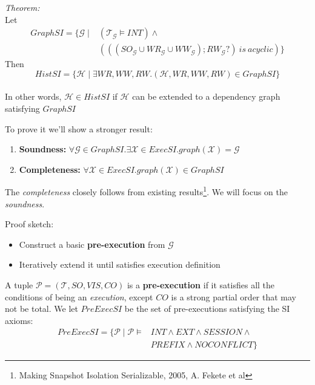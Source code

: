 \documentclass{beamer}
\begin{document}
\begin{frame}
	\textit{Theorem:} \\
	Let
	$$
		\begin{aligned}
		GraphSI = 
			\{ 
				\mathcal{G} 
				\mid &
				\left( \mathcal{T}_\mathcal{G} \vDash INT \right) \wedge \\
					 & \left(
						\left(
							\left(
								SO_\mathcal{G} \cup WR_\mathcal{G} \cup WW_\mathcal{G}
							\right)  ; RW_\mathcal{G}?
					\right) \ is \ acyclic
				\right)
			\}	
		\end{aligned}
	$$
	Then
	$$
		HistSI = \{ \mathcal{H} \mid \exists WR, WW, RW. (\mathcal{H}, WR, WW, RW) \in GraphSI \}
	$$
	\\
	In other words, $\mathcal{H} \in HistSI$ if $\mathcal{H}$ can be extended to a dependency graph satisfying $GraphSI$ 
\end{frame}

\begin{frame}
	To prove it we'll show a stronger result: \\
	\begin{enumerate}
		\item \textbf{Soundness:} $ \forall \mathcal{G} \in GraphSI. \exists \mathcal{X} \in ExecSI. graph(\mathcal{X}) = \mathcal{G} $ 
		\item \textbf{Completeness:} $ \forall \mathcal{X} \in ExecSI. graph(\mathcal{X}) \in GraphSI$
	\end{enumerate}
	The \textit{completeness} closely follows from existing results\footnote{Making Snapshot Isolation Serializable, 2005, A. Fekete et al}. We will focus on the \textit{soundness}.
	
\end{frame}

\begin{frame}
Proof sketch: \\

\begin{itemize}
	\item Construct a basic \textbf{pre-execution} from $\mathcal{G}$
	\item Iteratively extend it until satisfies execution definition
\end{itemize}

\end{frame}

\begin{frame}
	A tuple $\mathcal{P} = (\mathcal{T}, SO, VIS, CO) $ is a \textbf{pre-execution} if it satisfies all the conditions of being an \emph{execution}, except $CO$ is a strong partial order that may not be total. We let $PreExecSI$ be the set of pre-executions satisfying the SI axioms:
	$$
		\begin{aligned}
			PreExecSI = \{ \mathcal{P} \mid \mathcal{P} \vDash & INT \wedge EXT \wedge SESSION \wedge \\
															   & PREFIX \wedge NOCONFLICT \}
		\end{aligned}
	$$
\end{frame}
\end{document}
